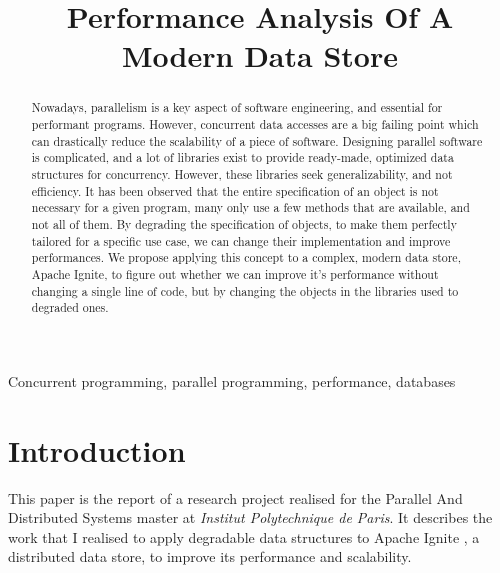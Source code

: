 \documentclass[conference]{IEEEtran}
\begin{document}
\title{Performance Analysis Of A Modern Data Store}

\author{
}

\maketitle
\thispagestyle{plain}
\pagestyle{plain}

\begin{abstract}
Nowadays, parallelism is a key aspect of software engineering, and essential for performant programs. However, concurrent data accesses are a big failing point which can drastically reduce the scalability of a piece of software. Designing parallel software is complicated, and a lot of libraries exist to provide ready-made, optimized data structures for concurrency. However, these libraries seek generalizability, and not efficiency. It has been observed that the entire specification of an object is not necessary for a given program, many only use a few methods that are available, and not all of them. By degrading the specification of objects, to make them perfectly tailored for a specific use case, we can change their implementation and improve performances. We propose applying this concept to a complex, modern data store, Apache Ignite, to figure out whether we can improve it's performance without changing a single line of code, but by changing the objects in the libraries used to degraded ones.

\end{abstract}

\begin{IEEEkeywords}
Concurrent programming, parallel programming, performance, databases
\end{IEEEkeywords}

\bigbreak 

\section{Introduction}
This paper is the report of a research project realised for the Parallel And Distributed Systems master at \textit{Institut Polytechnique de Paris}. It describes the work that I realised to apply degradable data structures to Apache Ignite \cite{ignite}, a distributed data store, to improve its performance and scalability.
\end{document}
